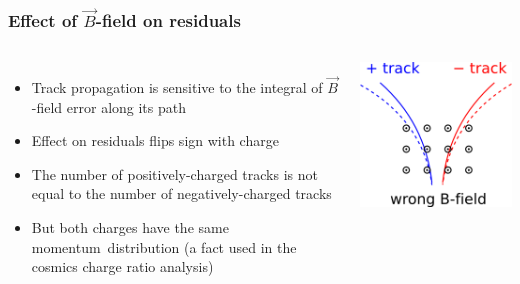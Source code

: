 \documentclass[compress]{beamer}
\begin{document}
\begin{frame}
\frametitle{Effect of $\vec{B}$-field on residuals}

\begin{columns}
\begin{itemize}
\item Track propagation is sensitive to the integral of $\vec{B}$-field error along its path
\item Effect on residuals flips sign with charge
\item The number of positively-charged tracks is not equal to the number of negatively-charged tracks
\item But both charges have the same \mbox{momentum distribution\hspace{-1 cm}} (a fact used in the cosmics charge ratio analysis)
\end{itemize}

\includegraphics[width=\linewidth]{antisymmetric_bfield.png}
\end{columns}


\end{frame}
\end{document}

